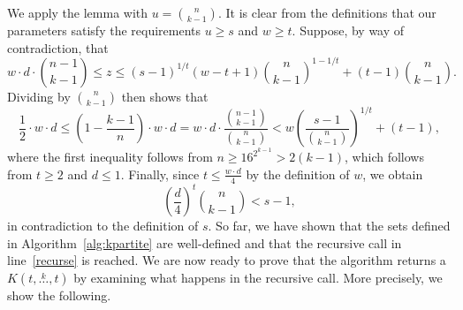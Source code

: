 \documentclass{amsart}
\newcommand{\compoverset}[2]{\ensuremath{K(#2, \overset{#1}{\dots}, #2)}}
\begin{document}
    We apply the lemma with $u = \binom{n}{k-1}$.
    It is clear from the definitions that our parameters satisfy the requirements $u \geq s$ and $w \geq t$.
    Suppose, by way of contradiction, that
    \[
        w \cdot d \cdot \binom{n - 1}{k-1} \leq z \leq (s - 1)^{1 / t}(w - t + 1)\binom{n}{k-1}^{1 - 1 / t} + (t - 1)\binom{n}{k-1}.
    \]
    Dividing by $\binom{n}{k-1}$ then shows that
    \[
        \frac{1}{2} \cdot w \cdot d
        \leq \left( 1 - \frac{k-1}{n}\right) \cdot w \cdot d
        = w \cdot d \cdot \frac{\binom{n-1}{k-1}}{\binom{n}{k-1}}
        < w \left( \frac{s-1}{\binom{n}{k-1} }\right)^{1 / t} + (t - 1),
    \]
    where the first inequality follows from $n \geq 16^{2^{k-1}} > 2(k-1)$, which follows from $t \geq 2$ and $d \leq 1$.
    Finally, since $t \leq \frac{w \cdot d}{4}$ by the definition of $w$, we obtain
    \[
        \left( \frac{d}{4}\right)^t \binom{n}{k-1} < s-1,
    \]
    in contradiction to the definition of $s$.
    So far, we have shown that the sets defined in Algorithm~\ref{alg:kpartite}
    are well-defined and that the recursive call in line~\ref{recurse} is reached.
    We are now ready to prove that the algorithm returns a $\compoverset{k}{t}$
    by examining what happens in the recursive call.
    More precisely, we show the following.
\end{document}
